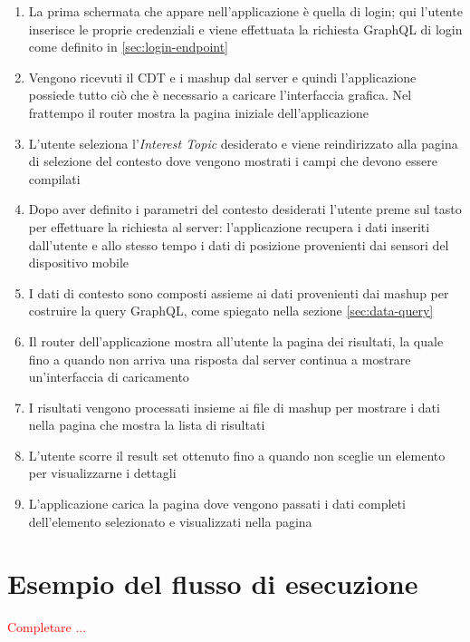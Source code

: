 \begin{enumerate}
	\item
	La prima schermata che appare nell'applicazione è quella di login; qui l'utente inserisce le proprie credenziali e viene effettuata la richiesta GraphQL di login come definito in \ref{sec:login-endpoint}
	\item
	Vengono ricevuti il CDT e i mashup dal server e quindi l'applicazione possiede tutto ciò che è necessario a caricare l'interfaccia grafica. Nel frattempo il router mostra la pagina iniziale dell'applicazione
	\item
	L'utente seleziona l'\emph{Interest Topic} desiderato e viene reindirizzato alla pagina di selezione del contesto dove vengono mostrati i campi che devono essere compilati
	\item
	Dopo aver definito i parametri del contesto desiderati l'utente preme sul tasto per effettuare la richiesta al server: l'applicazione recupera i dati inseriti dall'utente e allo stesso tempo i dati di posizione provenienti dai sensori del dispositivo mobile
	\item
	I dati di contesto sono composti assieme ai dati provenienti dai mashup per costruire la query GraphQL, come spiegato nella sezione \ref{sec:data-query}
	\item
	Il router dell'applicazione mostra all'utente la pagina dei risultati, la quale fino a quando non arriva una risposta dal server continua a mostrare un'interfaccia di caricamento
	\item
	I risultati vengono processati insieme ai file di mashup per mostrare i dati nella pagina che mostra la lista di risultati
	\item
	L'utente scorre il result set ottenuto fino a quando non sceglie un elemento per visualizzarne i dettagli
	\item
	L'applicazione carica la pagina dove vengono passati i dati completi dell'e\-le\-men\-to selezionato e visualizzati nella pagina
\end{enumerate}

\section{Esempio del flusso di esecuzione}

\textcolor{red}{Completare ...}
